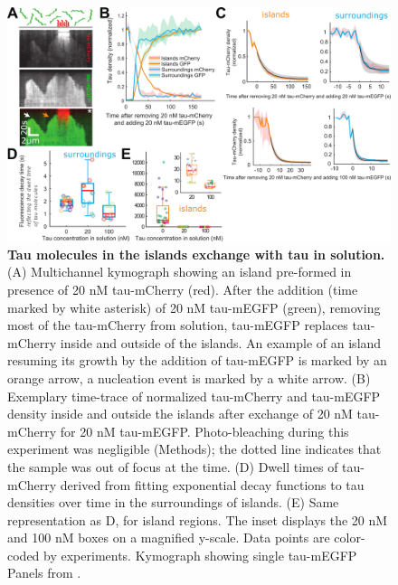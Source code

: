 \begin{figure}[h!]
	\centering
	\includegraphics[width=1\linewidth]{Figures/tau_EXCHANGE.png}
	\caption[Tau molecules in the islands exchange with tau in solution.]{
	\textbf{Tau molecules in the islands exchange with tau in solution.} (A) Multichannel kymograph showing an island pre-formed in presence of 20 nM tau-mCherry (red). After the addition (time marked by white asterisk) of 20 nM tau-mEGFP (green), removing most of the tau-mCherry from solution, tau-mEGFP replaces tau-mCherry inside and outside of the islands. An example of an island resuming its growth by the addition of tau-mEGFP is marked by an orange arrow, a nucleation event is marked by a white arrow. (B) Exemplary time-trace of normalized tau-mCherry and tau-mEGFP density inside and outside the islands after exchange of 20 nM tau-mCherry for 20 nM tau-mEGFP. Photo-bleaching during this experiment was negligible (Methods); the dotted line indicates that the sample was out of focus at the time. (D) Dwell times of tau-mCherry derived from fitting exponential decay functions to tau densities over time in the surroundings of islands. (E) Same representation as D, for island regions. The inset displays the 20 nM and 100 nM boxes on a magnified y-scale. Data points are color-coded by experiments. Kymograph showing single tau-mEGFP Panels from \cite{Siahaan2019a}.
		}\label{tauexchange}
\end{figure}

